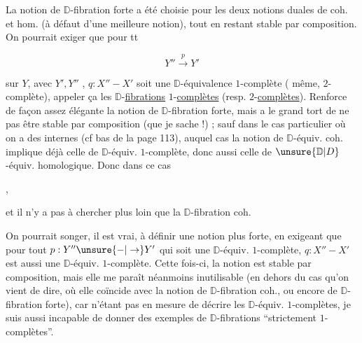 
La notion de $\mathbb D$-fibration forte a été  choisie pour  les deux notions duales de  coh. et hom. (à défaut d'une meilleure notion), tout en restant stable par composition. On pourrait exiger que pour tt

\[Y''\xrightarrow{p}Y'\]

sur $Y$, avec $Y',Y''$ , $q:X''-X'$ soit une $\mathbb D$-équivalence $1$-complète ( même,  $2$-complète), appeler ça les $\mathbb D$-\uline{fibrations} $1$-\uline{complètes} (resp. $2$-\uline{complètes}).  Renforce  de façon assez élégante la notion de $\mathbb D$-fibration forte, mais a le grand tort de ne pas être stable par composition (que je sache !) ; sauf dans le cas particulier où on a des  internes  (cf bas de la page 113), auquel cas la notion de $\mathbb D$-équiv. coh. implique déjà celle de $\mathbb D$-équiv. $1$-complète,
donc aussi celle de $\unsure{\mathbb D|D}$-équiv. homologique. Donc dans ce cas

,

et il n'y a pas à chercher plus loin que la $\mathbb D$-fibration coh.

On pourrait songer, il est vrai, à définir   une notion plus forte, en exigeant que pour tout $p:Y''\unsure{\mathord{-}|\to}Y'$  qui soit une $\mathbb D$-équiv. $1$-complète, $q:X''-X'$ est aussi une $\mathbb D$-équiv. $1$-complète. Cette fois-ci, la notion est stable par composition, mais elle me paraît néanmoins inutilisable (en dehors du cas qu'on vient de dire, où elle coïncide avec la notion de $\mathbb D$-fibration coh., ou encore de $\mathbb D$-fibration forte), car n'étant pas en mesure de décrire les $\mathbb D$-équiv. $1$-complètes, je suis aussi incapable de  donner des exemples  de $\mathbb D$-fibrations ``strictement $1$-complètes''.


